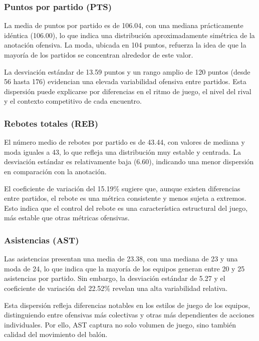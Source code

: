 \documentclass[12pt]{article}
\begin{document}
\subsubsection*{Puntos por partido (PTS)}

La media de puntos por partido es de 106.04, con una mediana prácticamente idéntica (106.00),
lo que indica una distribución aproximadamente simétrica de la anotación ofensiva. La moda,
ubicada en 104 puntos, refuerza la idea de que la mayoría de los partidos se concentran alrededor
de este valor.

La desviación estándar de 13.59 puntos y un rango amplio de 120 puntos (desde 56 hasta 176)
evidencian una elevada variabilidad ofensiva entre partidos. Esta dispersión puede explicarse
por diferencias en el ritmo de juego, el nivel del rival y el contexto competitivo de cada encuentro.

\subsubsection*{Rebotes totales (REB)}

El número medio de rebotes por partido es de 43.44, con valores de mediana y moda iguales a 43,
lo que refleja una distribución muy estable y centrada. La desviación estándar es relativamente
baja (6.60), indicando una menor dispersión en comparación con la anotación.

El coeficiente de variación del 15.19\% sugiere que, aunque existen diferencias entre partidos,
el rebote es una métrica consistente y menos sujeta a extremos. Esto indica que el control del
rebote es una característica estructural del juego, más estable que otras métricas ofensivas.

\subsubsection*{Asistencias (AST)}

Las asistencias presentan una media de 23.38, con una mediana de 23 y una moda de 24, lo que
indica que la mayoría de los equipos generan entre 20 y 25 asistencias por partido. Sin embargo,
la desviación estándar de 5.27 y el coeficiente de variación del 22.52\% revelan una alta variabilidad
relativa.

Esta dispersión refleja diferencias notables en los estilos de juego de los equipos, distinguiendo
entre ofensivas más colectivas y otras más dependientes de acciones individuales. Por ello, AST
captura no solo volumen de juego, sino también calidad del movimiento del balón.
\end{document}
